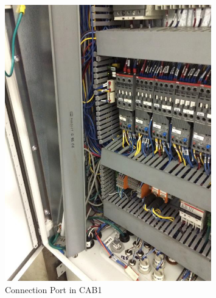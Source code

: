 \begin{figure}[H]
        \centering
        \includegraphics[width=0.8\textwidth]{pictures/burner_box/cab1_connection.jpg}
        \caption{Connection Port in CAB1}
        \label{fig:cab1_conn}
\end{figure}